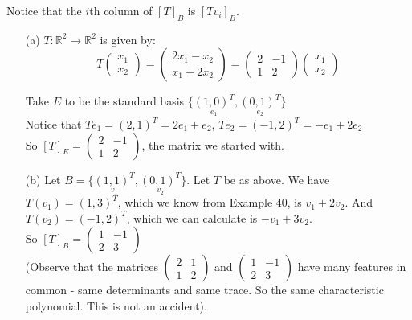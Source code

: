 \documentclass[10pt]{scrartcl}
\begin{document}
Notice that the $i$th column of $[T]_B$ is $[Tv_i]_B$.\\


\begin{examples}
\begin{itemize}
\item[(a)] $T: \mathbb{R}^2 \to \mathbb{R}^2$ is given by:
\[
T\begin{pmatrix}
x_1 \\ x_2
\end{pmatrix}
=
\begin{pmatrix}
2x_1 - x_2 \\ x_1 + 2x_2
\end{pmatrix}
= 
\begin{pmatrix}
2 & -1 \\ 1 & 2 
\end{pmatrix}\begin{pmatrix}
x_1 \\ x_2
\end{pmatrix}
\]


Take $E$ to be the standard basis $\{\underset{e_1}{(1,0)^T},\underset{e_2}{(0,1)^T}\}$\\
Notice that $Te_1 = (2,1)^T = 2e_1 + e_2$, $Te_2 = (-1,2)^T = -e_1 + 2e_2$\\

So $[T]_E = \begin{pmatrix}
 2 & -1 \\ 1 & 2
 \end{pmatrix}
$, the matrix we started with. 

\item[(b)] Let $B = \{\underset{v_1}{(1,1)^T},\underset{v_2}{(0,1)^T}\}$. Let $T$ be as above. We have $T(v_1) = (1,3)^T$, which we know from Example 40, is $v_1 + 2v_2$. And $T(v_2) = (-1,2)^T$, which we can calculate is $-v_1 + 3v_2$.\\
 So $[T]_B = \begin{pmatrix}
 1 & -1 \\ 2 & 3
 \end{pmatrix}$\\

 (Observe that the matrices $\begin{pmatrix}
 2 & 1 \\ 1 & 2
 \end{pmatrix}$ and $\begin{pmatrix}
 1 & -1 \\ 2 & 3
 \end{pmatrix}$ have many features in common - same determinants and same trace. So the same characteristic polynomial. This is not an accident). 


\end{itemize}
\end{examples}
\end{document}
